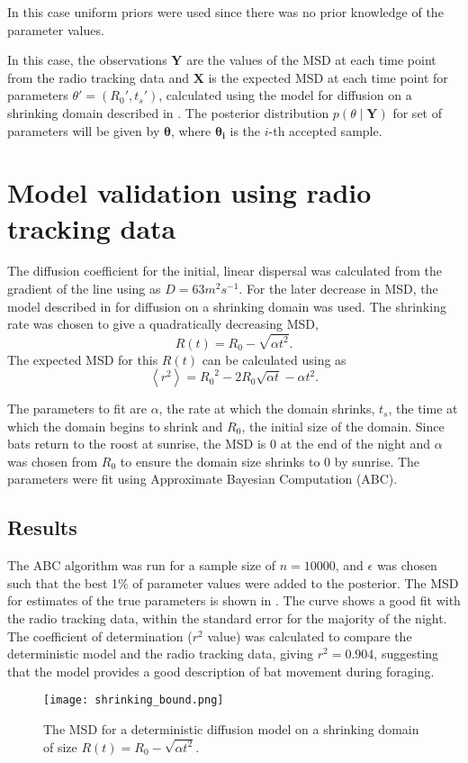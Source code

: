  In this case uniform priors were used since there was no prior knowledge of the parameter values.


 In this case, the observations $\bm{Y}$ are the values of the MSD at each time
 point from the radio tracking data and $\bm{X}$ is the expected MSD at each time
 point for parameters $\theta' = (R_0',t_s') $, calculated using the model for
 diffusion on a shrinking domain described in  . The
 posterior distribution $p(\theta \mid \bm{Y})$ for set of parameters will be
 given by $\bm{\theta}$, where $\bm{\theta_i}$ is the $i$-th accepted sample.

\section{Model validation using radio tracking data}


The diffusion coefficient for the initial, linear dispersal was calculated from
the gradient of the line using  as $D = 63 m^2s^{-1}$.
For the later decrease in MSD, the model described in   for diffusion
on a shrinking domain was used. The shrinking rate was chosen to give a
quadratically decreasing MSD,
%
\begin{equation}
R(t) = R_0 - \sqrt{\alpha t^2}.
\end{equation}
%
The expected MSD for this $R(t)$ can be calculated using 
as
%
 \begin{equation}
 \left<r^2\right>	= {R_0}^2 - 2R_0\sqrt{\alpha t} -\alpha t^2.
 \label{eqn:MSD_shrink}
 \end{equation}

The parameters to fit are $\alpha$, the rate at which the domain shrinks,
$t_s$, the time at which the domain begins to shrink and $R_0$, the initial size
of the domain. Since bats return to the roost at sunrise, the MSD is 0 at the end of the night and $\alpha$ was chosen from $R_0$ to ensure the domain size shrinks to 0 by sunrise. The parameters were fit using Approximate Bayesian Computation (ABC).

\subsection{Results}

The ABC algorithm was run for a sample size of $n = 10000$, and $\epsilon$ was chosen such that the best 1\% of parameter values were added to the posterior. The MSD for estimates of the true parameters is shown in . The curve shows a good fit with the radio tracking data, within the standard error for the majority of the night. The coefficient of determination ($r^2$ value) was calculated to compare the deterministic model and the radio tracking data, giving $r^2 = 0.904$, suggesting that the model provides a good description of bat movement during foraging.

\begin{figure} [h]
    \centering
        \texttt{[image: shrinking\_bound.png]}
        \caption{The MSD for a deterministic diffusion model on a shrinking domain of size $R(t) = R_0 - \sqrt{\alpha t^2}$. }
    \label{fig:fit}
\end{figure}
